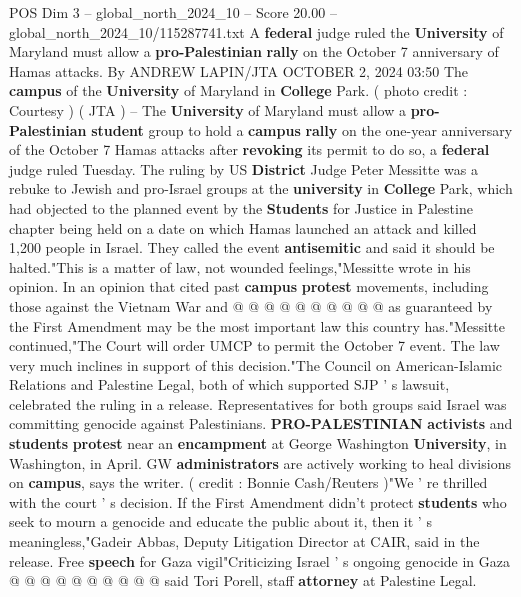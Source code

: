 \begin{textsample}{POS Dim 3 – global\_north\_2024\_10 – Score 20.00 – global\_north\_2024\_10/115287741.txt}  \label{ex:f3_pos_126}
A \textbf{federal} judge ruled the \textbf{University} of Maryland must allow a \textbf{pro-Palestinian} \textbf{rally} on the October 7 anniversary of Hamas attacks.
By ANDREW LAPIN/JTA OCTOBER 2, 2024 03:50 The \textbf{campus} of the \textbf{University} of Maryland in \textbf{College} Park. ( photo credit : Courtesy ) ( JTA ) -- The \textbf{University} of Maryland must allow a \textbf{pro-Palestinian} \textbf{student} group to hold a \textbf{campus} \textbf{rally} on the one-year anniversary of the October 7 Hamas attacks after \textbf{revoking} its permit to do so, a \textbf{federal} judge ruled Tuesday.
The ruling by US \textbf{District} Judge Peter Messitte was a rebuke to Jewish and pro-Israel groups at the \textbf{university} in \textbf{College} Park, which had objected to the planned event by the \textbf{Students} for Justice in Palestine chapter being held on a date on which Hamas launched an attack and killed 1,200 people in Israel.
They called the event \textbf{antisemitic} and said it should be halted."This is a matter of law, not wounded feelings,"Messitte wrote in his opinion.
In an opinion that cited past \textbf{campus} \textbf{protest} movements, including those against the Vietnam War and @ @ @ @ @ @ @ @ @ @ as guaranteed by the First Amendment may be the most important law this country has."Messitte continued,"The Court will order UMCP to permit the October 7 event.
The law very much inclines in support of this decision."The Council on American-Islamic Relations and Palestine Legal, both of which supported SJP ' s lawsuit, celebrated the ruling in a release.
Representatives for both groups said Israel was committing genocide against Palestinians. \textbf{PRO-PALESTINIAN} \textbf{activists} and \textbf{students} \textbf{protest} near an \textbf{encampment} at George Washington \textbf{University}, in Washington, in April.
GW \textbf{administrators} are actively working to heal divisions on \textbf{campus}, says the writer. ( credit : Bonnie Cash/Reuters )"We ' re thrilled with the court ' s decision.
If the First Amendment didn't protect \textbf{students} who seek to mourn a genocide and educate the public about it, then it ' s meaningless,"Gadeir Abbas, Deputy Litigation Director at CAIR, said in the release.
Free \textbf{speech} for Gaza vigil"Criticizing Israel ' s ongoing genocide in Gaza @ @ @ @ @ @ @ @ @ @ said Tori Porell, staff \textbf{attorney} at Palestine Legal.

\end{textsample}
